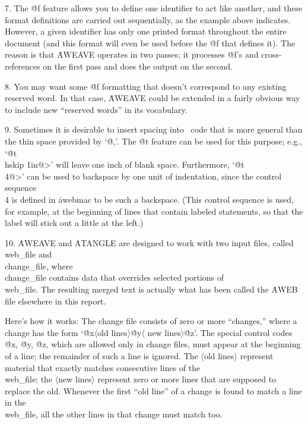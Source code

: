 7. The \.{@f} feature allows you to define one identifier to act like
another, and these format definitions are carried out sequentially, as the
example above indicates. However, a given identifier has only one printed format
throughout the entire document (and this format will even be used before
the \.{@f} that defines it). The reason is that \.{AWEAVE} operates in two
passes; it processes \.{@f}'s and cross-references on the first pass and
does the output on the second.
 
8. You may want some \.{@f} formatting that doesn't correspond to any
existing reserved word. In that case, \.{AWEAVE} could be extended in a
fairly obvious way to include new ``reserved words'' in its vocabulary.
 
9. Sometimes it is desirable to insert spacing into \ADA\ code that is
more general than the thin space provided by `\.{@,}'. The \.{@t} feature
can be used for this purpose; e.g., `\.{@t\\hskip 1in@>}' will
leave one inch of blank space. Furthermore, `\.{@t\\4@>}' can be
used to backspace by one unit of indentation, since the control sequence
\.{\\4} is defined in \.{awebmac} to be such a backspace. (This
control sequence is used, for example, at the beginning of lines that
contain labeled statements, so that the label will stick out a little at
the left.)
 
10. \.{AWEAVE} and \.{ATANGLE} are designed to work with two input files,
called \\{web\_file} and \\{change\_file}, where \\{change\_file} contains
data that overrides selected portions of \\{web\_file}. The resulting merged
text is actually what has been called the \.{AWEB} file elsewhere in this
report.
 
Here's how it works: The change file consists of zero or more ``changes,''
where a change has the form `\.{@x}$\langle$old lines$\rangle$\.{@y}$\langle$%
new lines$\rangle$\.{@z}'. The special control codes \.{@x}, \.{@y}, \.{@z},
which are allowed only in change files, must appear at the beginning of a line;
the remainder of such a line is ignored.
The $\langle$old lines$\rangle$ represent material that exactly matches
consecutive lines of the \\{web\_file}; the $\langle$new lines$\rangle$
represent zero or more lines that are supposed to replace the old. Whenever
the first ``old line'' of a change is found to match a line in the
\\{web\_file}, all the other lines in that change must match too.
 
